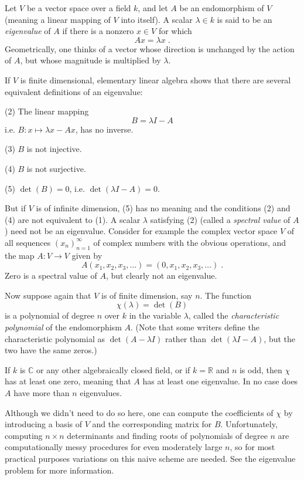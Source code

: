 \documentclass[12pt]{article}
\begin{document}
\newcommand{\Z}{\mathbb{Z}}
\newcommand{\R}{\mathbb{R}}
\newcommand{\C}{\mathbb{C}}
Let $V$ be a vector space over a field $k$, and let $A$ be an
endomorphism of $V$ (meaning a linear mapping of $V$ into itself).
A scalar $\lambda\in k$ is said to be an
\emph{eigenvalue} of $A$ if there is a nonzero $x \in V$ for which
\begin{equation}
Ax = \lambda x\;.
\end{equation}
Geometrically, one thinks of a vector whose direction is unchanged
by the action of $A$, but whose magnitude is multiplied by $\lambda$.

If $V$ is finite dimensional, elementary linear algebra shows that
there are several equivalent definitions of an eigenvalue:

\noindent
(2) The linear mapping $$B=\lambda I - A$$
i.e. $B:x\mapsto \lambda x-Ax$, has no inverse.

\noindent
(3) $B$ is not injective.

\noindent
(4) $B$ is not surjective.

\noindent
(5) $\det(B)=0$, i.e. $\det(\lambda I-A)=0$.

But if $V$ is of infinite dimension, (5) has no meaning and the
conditions (2) and (4) are not equivalent to (1).
A scalar $\lambda$ satisfying (2) (called a \emph{spectral value} of
$A$) need not be an eigenvalue. Consider for example the complex
vector space $V$ of all sequences $(x_n)_{n=1}^{\infty}$ of complex
numbers with the obvious operations, and the map $A: V \to V$ given by
$$ A(x_1, x_2, x_3, \dots) = (0, x_1, x_2, x_3, \dots) \;. $$
Zero is a spectral value of $A$, but clearly not an eigenvalue.

Now suppose again that $V$ is of finite dimension, say $n$.
The function $$\chi(\lambda)=\det(B)$$
is a polynomial of degree $n$ over $k$ in the
variable $\lambda$, called the \emph{characteristic polynomial} of the
endomorphism $A$. (Note that some writers define the characteristic
polynomial as $\det(A-\lambda I)$ rather than $\det(\lambda I-A)$, but the
two have the same zeros.)

If $k$ is $\C$ or any other algebraically closed field, or if $k=\R$
and $n$ is odd, then $\chi$ has at least one zero, meaning that $A$
has at least one eigenvalue. In no case does $A$ have more than $n$
eigenvalues.

Although we didn't need to do so here, one can compute the coefficients
of $\chi$ by introducing a basis of $V$ and the corresponding matrix for
$B$. Unfortunately, computing $n \times n$ determinants and finding roots
of polynomials of degree $n$ are computationally messy procedures
for even moderately large $n$, so for most practical purposes
variations on this naive scheme are needed.  See the eigenvalue
problem for more information.
\end{document}
